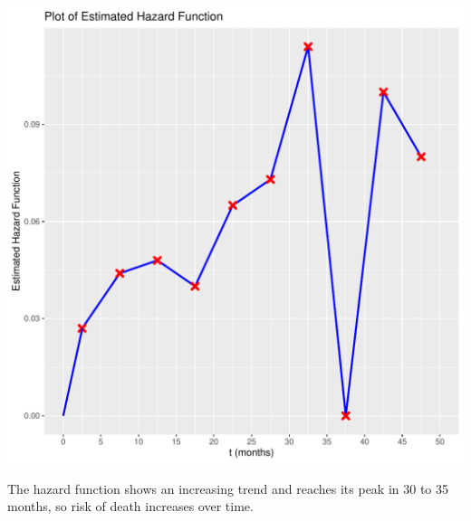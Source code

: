 \documentclass[11pt, a4paper]{article}\usepackage[]{graphicx}\usepackage[]{xcolor}
\makeatletter
\def\maxwidth{ %
  \ifdim\Gin@nat@width>\linewidth
    \linewidth
  \else
    \Gin@nat@width
  \fi
}
\newenvironment{knitrout}{}{} %
\makeatother
\begin{document}
\begin{knitrout}
\includegraphics[width=\maxwidth]{figure/unnamed-chunk-11-1} 
\end{knitrout}

\smallpencil \hspace{0.1cm} {\setlength{\spaceskip}{1em plus 0.5em minus 0.5em} \fontsize{17}{20}\myfont The hazard function shows an increasing trend and reaches its peak in 30 to 35 months, so risk of death increases over time. \par}
\end{document}
